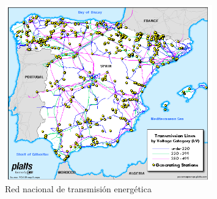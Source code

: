 

\vspace{3mm}

\begin{figure}[h]
  \centering
  \includegraphics[width=0.8\textwidth]{img/teoria/spain.png}
  \caption{Red nacional de transmisión energética \cite{spain}}
  \label{fig:spain}
\end{figure}


